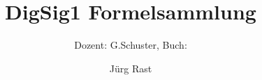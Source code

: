 \documentclass{scrartcl}
\title{DigSig1 Formelsammlung}
\subtitle{Dozent: G.Schuster, Buch: }
\author{Jürg Rast}
\begin{document}
\begin{titlepage}
	\maketitle
	\thispagestyle{empty}
\end{titlepage}


\newpage

\tableofcontents

\newpage








\end{document}
